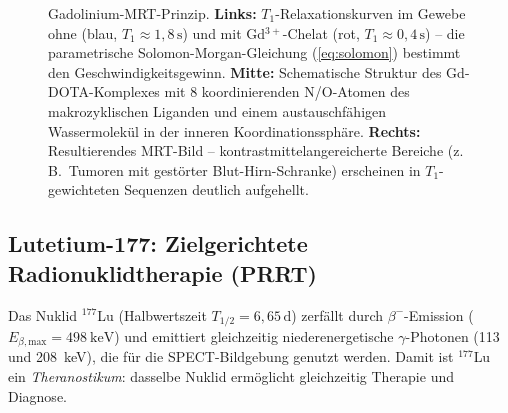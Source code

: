 ﻿\documentclass[12pt, a4paper]{report}
\theoremstyle{definition}
\theoremstyle{remark}
\begin{document}
\begin{figure}[htbp]
\caption{Gadolinium-MRT-Prinzip.
  \textbf{Links:} $T_1$-Relaxationskurven im Gewebe ohne (blau,
  $T_1 \approx 1{,}8\,\text{s}$) und mit Gd$^{3+}$-Chelat (rot,
  $T_1 \approx 0{,}4\,\text{s}$) -- die parametrische Solomon-Morgan-Gleichung
  (\ref{eq:solomon}) bestimmt den Geschwindigkeitsgewinn.
  \textbf{Mitte:} Schematische Struktur des Gd-DOTA-Komplexes mit 8
  koordinierenden N/O-Atomen des makrozyklischen Liganden und einem
  austauschfähigen Wassermolekül in der inneren Koordinationssphäre.
  \textbf{Rechts:} Resultierendes MRT-Bild -- kontrastmittelangereicherte
  Bereiche (z.\,B.\ Tumoren mit gestörter Blut-Hirn-Schranke) erscheinen
  in $T_1$-gewichteten Sequenzen deutlich aufgehellt.}
\label{fig:re_mrt}
\end{figure}

\subsection{\texorpdfstring{Lutetium-177: Zielgerichtete Radionuklidtherapie (PRRT)}{Lutetium-177: Zielgerichtete Radionuklidtherapie (PRRT)}}

Das Nuklid $^{177}$Lu (Halbwertszeit $T_{1/2} = 6{,}65\,\text{d}$) zerfällt
durch $\beta^-$-Emission ($E_{\beta,\text{max}} = \SI{498}{\kilo\electronvolt}$)
und emittiert gleichzeitig niederenergetische $\gamma$-Photonen (113 und
208~keV), die für die SPECT-Bildgebung genutzt werden. Damit ist
$^{177}$Lu ein \emph{Theranostikum}: dasselbe Nuklid ermöglicht gleichzeitig
Therapie und Diagnose.
\end{document}
